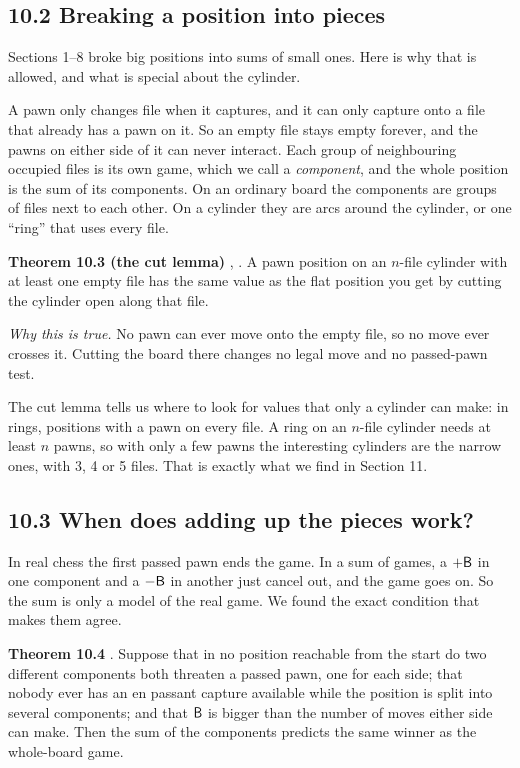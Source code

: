 \subsection*{10.2 Breaking a position into pieces}

\indent Sections 1--8 broke big positions into sums of small ones. Here is why that is allowed, and what is
special about the cylinder.

\indent A pawn only changes file when it captures, and it can only capture onto a file that already has a pawn
on it. So an empty file stays empty forever, and the pawns on either side of it can never interact. Each group of
neighbouring occupied files is its own game, which we call a \emph{component}, and the whole position is the sum
of its components. On an ordinary board the components are groups of files next to each other. On a cylinder they
are arcs around the cylinder, or one ``ring'' that uses every file.

\indent \textbf{Theorem 10.3 (the cut lemma)} \proved, \checkedtwo. A pawn position on an $n$-file cylinder with
at least one empty file has the same value as the flat position you get by cutting the cylinder open along that
file.

\indent \textit{Why this is true.} No pawn can ever move onto the empty file, so no move ever crosses it. Cutting
the board there changes no legal move and no passed-pawn test.

\indent The cut lemma tells us where to look for values that only a cylinder can make: in rings, positions with
a pawn on every file. A ring on an $n$-file cylinder needs at least $n$ pawns, so with only a few pawns the
interesting cylinders are the narrow ones, with 3, 4 or 5 files. That is exactly what we find in Section 11.

\subsection*{10.3 When does adding up the pieces work?}

\indent In real chess the first passed pawn ends the game. In a sum of games, a $+\mathsf{B}$ in one component and a
$-\mathsf{B}$ in another just cancel out, and the game goes on. So the sum is only a model of the real game. We found
the exact condition that makes them agree.

\indent \textbf{Theorem 10.4} \proved. Suppose that in no position reachable from the start do two different
components both threaten a passed pawn, one for each side; that nobody ever has an en passant capture available
while the position is split into several components; and that $\mathsf{B}$ is bigger than the number of moves either
side can make. Then the sum of the components predicts the same winner as the whole-board game.

